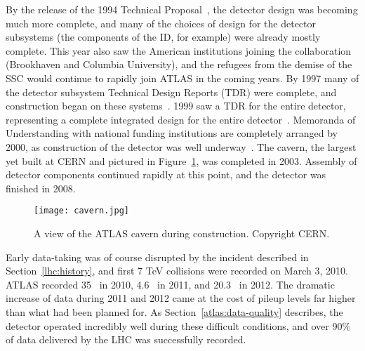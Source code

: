 By the release of the 1994 Technical Proposal~\cite{ATLASTP}, the detector design was becoming much more complete, and many of the choices of design for the detector subsystems (the components of the ID, for example) were already mostly complete. This year also saw the American institutions joining the collaboration (Brookhaven and Columbia University), and the refugees from the demise of the SSC would continue to rapidly join ATLAS in the coming years.  By 1997 many of the detector subsystem Technical Design Reports (TDR) were complete, and construction began on these systems~\cite{ATLASHistory}. 1999 saw a TDR for the entire detector, representing a complete integrated design for the entire detector~\cite{tdr1,tdr2}. Memoranda of Understanding with national funding institutions are completely arranged by 2000, as construction of the detector was well underway~\cite{ATLASHistory}. The cavern, the largest yet built at CERN and pictured in Figure~\ref{fig:detector:cavern}, was completed in 2003. Assembly of detector components continued rapidly at this point, and the detector was finished in 2008.


\begin{figure}
\centering
\texttt{[image: cavern.jpg]}
\label{fig:detector:cavern}
\caption{A view of the ATLAS cavern during construction. Copyright CERN.}
\end{figure}


Early data-taking was of course disrupted by the incident described in Section~\ref{lhc:history}, and first 7 TeV collisions were recorded on March 3, 2010. ATLAS recorded 35 \ipb~in 2010, 4.6 \ifb~in 2011, and 20.3 \ifb~in 2012. The dramatic increase of data during 2011 and 2012 came at the cost of pileup levels far higher than what had been planned for. As Section~\ref{atlas:data-quality} describes, the detector operated incredibly well during these difficult conditions, and over 90\% of data delivered by the LHC was successfully recorded.











